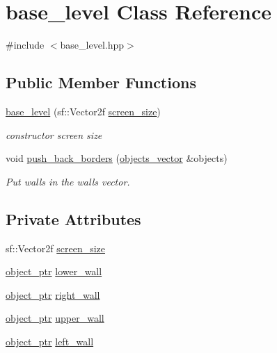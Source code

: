 \hypertarget{classbase__level}{}\section{base\+\_\+level Class Reference}
\label{classbase__level}


{\ttfamily \#include $<$base\+\_\+level.\+hpp$>$}

\subsection*{Public Member Functions}
\begin{DoxyCompactItemize}
\item 
\hyperlink{classbase__level_addf165fdc5f4e953be3b6a2dcd00459b}{base\+\_\+level} (sf\+::\+Vector2f \hyperlink{classbase__level_a69702ca202fa2a3a4c83faaa807971c2}{screen\+\_\+size})
\begin{DoxyCompactList}\small\item\em constructor screen size \end{DoxyCompactList}\item 
void \hyperlink{classbase__level_a3b2da28cf45cad434103e81ee6c4538d}{push\+\_\+back\+\_\+borders} (\hyperlink{drawable_8hpp_a6c0fdb1dfd0c34dbbdbb5dcd3c608b07}{objects\+\_\+vector} \&objects)
\begin{DoxyCompactList}\small\item\em Put walls in the walls vector. \end{DoxyCompactList}\end{DoxyCompactItemize}
\subsection*{Private Attributes}
\begin{DoxyCompactItemize}
\item 
sf\+::\+Vector2f \hyperlink{classbase__level_a69702ca202fa2a3a4c83faaa807971c2}{screen\+\_\+size}
\item 
\hyperlink{drawable_8hpp_aab5add95f06d2ba25dbfed8eb07274fa}{object\+\_\+ptr} \hyperlink{classbase__level_a196474637fdc953f4f2ed088ace891f7}{lower\+\_\+wall}
\item 
\hyperlink{drawable_8hpp_aab5add95f06d2ba25dbfed8eb07274fa}{object\+\_\+ptr} \hyperlink{classbase__level_a4a1f6a57a83aec4bd0b82072ab21df43}{right\+\_\+wall}
\item 
\hyperlink{drawable_8hpp_aab5add95f06d2ba25dbfed8eb07274fa}{object\+\_\+ptr} \hyperlink{classbase__level_a5e4ab9bce71cb388025305d0f20cb7bf}{upper\+\_\+wall}
\item 
\hyperlink{drawable_8hpp_aab5add95f06d2ba25dbfed8eb07274fa}{object\+\_\+ptr} \hyperlink{classbase__level_a29e885695d2a043bdab849dcb73c5c8e}{left\+\_\+wall}
\end{DoxyCompactItemize}


